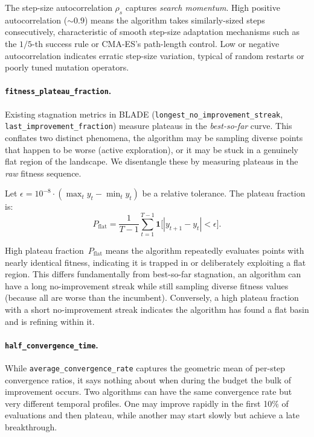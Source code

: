 The step-size autocorrelation $\rho_s$ captures \emph{search momentum}. High positive autocorrelation (${\sim}0.9$) means the algorithm takes similarly-sized steps consecutively, characteristic of smooth step-size adaptation mechanisms such as the $1/5$-th success rule or CMA-ES's path-length control. Low or negative autocorrelation indicates erratic step-size variation, typical of random restarts or poorly
tuned mutation operators.

\paragraph{\texttt{fitness\_plateau\_fraction}.}
\label{sec:features:novel:plateau}

Existing stagnation metrics in BLADE (\texttt{longest\_no\_improvement\_streak},
\texttt{last\_improvement\_fraction}) measure plateaus in the \emph{best-so-far}
curve.  This conflates two distinct phenomena, the algorithm may be sampling diverse points that happen to be worse (active exploration), or it may be stuck in a genuinely flat region of the landscape.  We disentangle these by measuring plateaus in the \emph{raw} fitness sequence.

Let $\epsilon = 10^{-8} \cdot (\max_t y_t - \min_t y_t)$ be a relative
tolerance.  The plateau fraction is:
\begin{equation}
\label{eq:plateau}
  P_{\mathrm{flat}}
    = \frac{1}{T-1}\sum_{t=1}^{T-1}
      \mathbf{1}\!\bigl[|y_{t+1} - y_t| < \epsilon\bigr].
\end{equation}

High plateau fraction~$P_{\mathrm{flat}}$ means the algorithm repeatedly evaluates points with nearly identical fitness, indicating it is trapped in or deliberately exploiting a flat region.  This differs fundamentally from best-so-far stagnation, an algorithm can have a long no-improvement streak while still sampling diverse fitness values (because all are worse than the incumbent).  Conversely, a high plateau fraction with a short no-improvement streak indicates the algorithm has found a flat basin and is refining within it.

\paragraph{\texttt{half\_convergence\_time}.}
\label{sec:features:novel:halftime}

While \texttt{average\_convergence\_rate} captures the geometric mean of
per-step convergence ratios, it says nothing about when during the budget the
bulk of improvement occurs.  Two algorithms can have the same convergence rate
but very different temporal profiles. One may improve rapidly in the first 10\% of evaluations and then plateau, while another may start slowly but achieve a late breakthrough.

